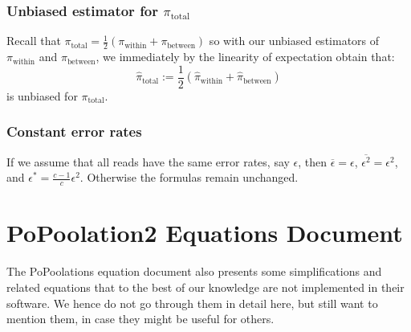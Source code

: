 \documentclass[a4paper,fontsize=9pt,DIV=14]{scrartcl}
\newcounter{todo}
\newcommand\todo[1]{{\stepcounter{todo}\color{purple}{TODO \arabic{todo}: #1}}}
\newcommand*{\piw}{$\pi_\text{within}$\xspace}
\def\mathpiw{\pi_\text{within}}
\newcommand*{\pib}{$\pi_\text{between}$\xspace}
\def\mathpib{\pi_\text{between}}
\newcommand*{\pit}{$\pi_\text{total}$\xspace}
\def\mathpit{\pi_\text{total}}
\begin{document}

\subsubsection*{Unbiased estimator for \pit}
\label{supp:sec:FST:sub:HeterozygositySequencingError:sub:UnbiasedPIT}

Recall that $\mathpit = \frac{1}{2}\left(\mathpiw + \mathpib\right)$ so with our unbiased estimators of \piw and \pib, we immediately by the linearity of expectation obtain that:
\[
\widehat{\pi}_\text{total} := \frac{1}{2}\left(\widehat{\pi}_\text{within} + \widehat{\pi}_\text{between}\right)
\]
is unbiased for \pit.


\subsubsection*{Constant error rates}
\label{supp:sec:FST:sub:HeterozygositySequencingError:sub:ConstErr}

If we assume that all reads have the same error rates, say $\epsilon$, then $\overline{\epsilon} = \epsilon$, $\overline{\epsilon^2} = \epsilon^2$, and $\epsilon^* = \frac{c-1}{c}\epsilon^2$.  Otherwise the formulas remain unchanged.


\section{PoPoolation2 Equations Document}
\label{supp:sec:PoPoolation2Equations}

The PoPoolations equation document also presents some simplifications and related equations that to the best of our knowledge are not implemented in their software.
We hence do not go through them in detail here, but still want to mention them, in case they might be useful for others.
\end{document}
